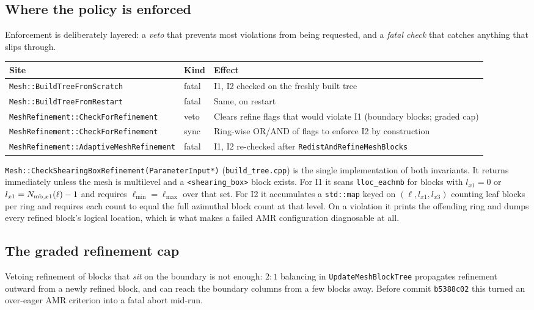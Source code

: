 \documentclass[11pt]{article}
\newcommand{\code}[1]{\texttt{#1}}
\newcommand{\file}[1]{\texttt{\small #1}}
\newcommand{\fn}[1]{\texttt{\small #1}}
\begin{document}
\subsection{Where the policy is enforced}
\label{sec:enforce}

Enforcement is deliberately layered: a \emph{veto} that prevents most violations from
being requested, and a \emph{fatal check} that catches anything that slips through.

\begin{center}
\small
\begin{tabular}{@{}llp{6.5cm}@{}}
\toprule
Site & Kind & Effect \\
\midrule
\fn{Mesh::BuildTreeFromScratch} & fatal & I1, I2 checked on the freshly built tree \\
\fn{Mesh::BuildTreeFromRestart} & fatal & Same, on restart \\
\fn{MeshRefinement::CheckForRefinement} & veto & Clears refine flags that would
violate I1 (boundary blocks; graded cap) \\
\fn{MeshRefinement::CheckForRefinement} & sync & Ring-wise OR/AND of flags to enforce
I2 by construction \\
\fn{MeshRefinement::AdaptiveMeshRefinement} & fatal & I1, I2 re-checked after
\fn{RedistAndRefineMeshBlocks} \\
\bottomrule
\end{tabular}
\end{center}

\fn{Mesh::CheckShearingBoxRefinement(ParameterInput*)} (\file{build\_tree.cpp}) is the
single implementation of both invariants. It returns immediately unless the mesh is
multilevel and a \code{<shearing\_box>} block exists. For I1 it scans
\code{lloc\_eachmb} for blocks with $l_{x1} = 0$ or
$l_{x1} = N_{{\rm mb},x1}(\ell) - 1$ and requires
$\ell_{\min} = \ell_{\max}$ over that set. For I2 it accumulates a
\code{std::map} keyed on $(\ell, l_{x1}, l_{x3})$ counting leaf blocks per ring and
requires each count to equal the full azimuthal block count at that level. On a
violation it prints the offending ring and dumps every refined block's logical
location, which is what makes a failed AMR configuration diagnosable at all.

\subsection{The graded refinement cap}
\label{sec:gradedcap}

Vetoing refinement of blocks that \emph{sit} on the boundary is not enough: $2{:}1$
balancing in \fn{UpdateMeshBlockTree} propagates refinement outward from a newly
refined block, and can reach the boundary columns from a few blocks away. Before
commit \code{b5388c02} this turned an over-eager AMR criterion into a fatal abort
mid-run.
\end{document}
